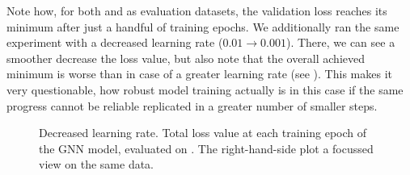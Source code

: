 \documentclass[
	fontsize=10pt, %
	twoside=false, %
	secnumdepth=1, %
]{kaobook}
\begin{document}
Note how, for both \PDMap and \ReconMap as evaluation datasets, the validation
loss reaches its minimum after just a handful of training epochs. We
additionally ran the same experiment with a decreased learning rate ($0.01
\rightarrow 0.001$). There, we can see a smoother decrease the loss value, but
also note that the overall achieved minimum is worse than in case of a greater
learning rate (see ). This makes it
very questionable, how robust model training actually is in this case if the
same progress cannot be reliable replicated in a greater number of smaller steps.
\begin{figure}[h]
  \centering
  \begin{subfigure}[h]{0.49\linewidth}
  \end{subfigure}
  \begin{subfigure}[h]{0.49\linewidth}
  \end{subfigure}
  \caption{Decreased learning rate. Total loss value at each training epoch of
    the GNN model, evaluated on \ReconMap. The right-hand-side plot a focussed
    view on the same data.}
  \label{fig:svm-repro-lowlr-reconmapolder-loss}
\end{figure}


\end{document}
